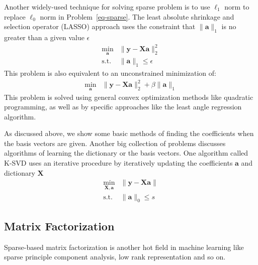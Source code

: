 Another widely-used technique for solving sparse problem is to use $\ell_1$ norm to replace $\ell_0$ norm in Problem~\ref{eq-sparse}.
The least absolute shrinkage and selection operator (LASSO) approach uses the constraint that $\|\mathbf{a}\|_1$ is no greater than a given value $\epsilon$
\begin{equation}
\begin{array}{cl}
\min_{\mathbf{a}} & \|\mathbf{y}-\mathbf{X}\mathbf{a}\|_2^2\\
\mathrm{s.t.} & \|\mathbf{a}\|_1 \leq \epsilon
\end{array}
\end{equation}
This problem is also equivalent to an unconstrained minimization of:
\begin{equation}
\begin{array}{cl}
\min_{\mathbf{a}} & \|\mathbf{y}-\mathbf{X}\mathbf{a}\|_2^2 + \beta \|\mathbf{a}\|_1
\end{array}
\end{equation}
This problem is solved using general convex optimization methods like quadratic programming, as well as by specific approaches like the least angle regression algorithm.

As discussed above, we show some basic methods of finding the coefficients when the basis vectors are given.
Another big collection of problems discusses algorithms of learning the dictionary or the basis vectors.
One algorithm called K-SVD uses an iterative procedure by iteratively updating the coefficients $\mathbf{a}$ and dictionary $\mathbf{X}$
\begin{equation}
\begin{array}{cl}
\min_{\mathbf{X},\mathbf{a}} & \|\mathbf{y}-\mathbf{X}\mathbf{a}\| \\
\mathrm{s.t.} & \|\mathbf{a}\|_0 \leq s
\end{array}
\end{equation}

\subsection{Matrix Factorization}
Sparse-based matrix factorization is another hot field in machine learning like sparse principle component analysis, low rank representation and so on.